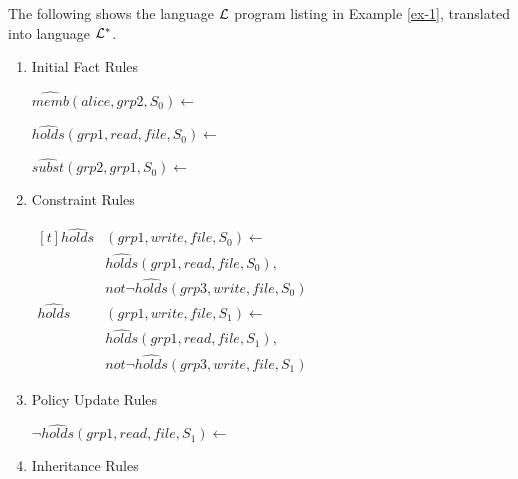 \documentclass[global,twocolumn,draft]{svjour}
\newenvironment{vexample}
  {\begin{example}\hspace{0.25em}}
  {\end{example}}
\begin{document}
        \begin{vexample}
          \label{ex-2}
          The following shows the language ${\cal L}$ program listing in
          Example \ref{ex-1},  translated into language ${\cal L}^{*}$.

          \begin{enumerate}
            \item
              Initial Fact Rules

              $\hat{memb}(alice, grp2, S_{0}) \leftarrow$

              $\hat{holds}(grp1, read, file,S_{0}) \leftarrow$

              $\hat{subst}(grp2, grp1, S_{0}) \leftarrow$

            \item
              Constraint Rules

              \begin{math}
                \begin{aligned}[t]
                  \hat{holds}&(grp1, write, file, S_{0}) \leftarrow \\
                  & \hat{holds}(grp1, read, file, S_{0}), \\
                  & not \lnot \hat{holds}(grp3, write, file, S_{0}) \\
                  \hat{holds}&(grp1, write, file, S_{1}) \leftarrow \\
                  & \hat{holds}(grp1, read, file, S_{1}), \\
                  & not \lnot \hat{holds}(grp3, write, file, S_{1})
                \end{aligned}
              \end{math}

            \item
              Policy Update Rules

              \begin{math}
                \lnot \hat{holds}(grp1, read, file, S_{1}) \leftarrow
              \end{math}

            \item
              Inheritance Rules


\end{enumerate}
\end{vexample}
\end{document}
